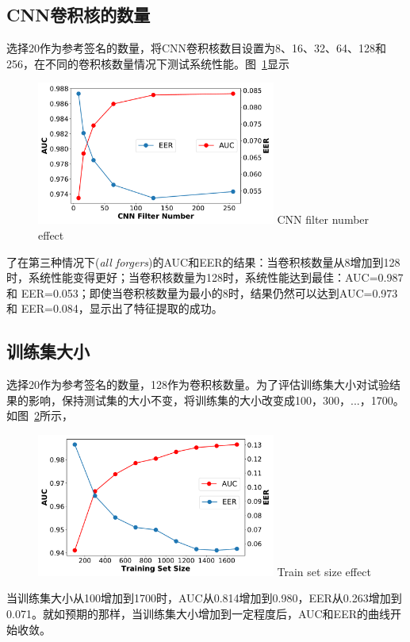\subsection{CNN卷积核的数量}
选择20作为参考签名的数量，将CNN卷积核数目设置为8、16、32、64、128和256，在不同的卷积核数量情况下测试系统性能。图~\ref{fig:filter-number-effect}显示
\begin{figure}
  \centering
  \includegraphics[width=0.7\textwidth]{figure/filter_number_auc_eer.pdf}
      {CNN filter number effect }
  \label{fig:filter-number-effect}
\end{figure}
了在第三种情况下(\textit{all forgers})的AUC和EER的结果：当卷积核数量从8增加到128时，系统性能变得更好；当卷积核数量为128时，系统性能达到最佳：AUC=0.987 和 EER=0.053；即使当卷积核数量为最小的8时，结果仍然可以达到AUC=0.973 和 EER=0.084，显示出了特征提取的成功。 

\subsection{训练集大小}
选择20作为参考签名的数量，128作为卷积核数量。为了评估训练集大小对试验结果的影响，保持测试集的大小不变，将训练集的大小改变成100，300，...，1700。如图~\ref{fig:train-size-effect}所示，
\begin{figure}
  \centering
  \includegraphics[width=0.7\textwidth]{figure/train_size_auc_eer.pdf}
      {Train set size effect }
  \label{fig:train-size-effect}
\end{figure}
当训练集大小从100增加到1700时，AUC从0.814增加到0.980，EER从0.263增加到0.071。就如预期的那样，当训练集大小增加到一定程度后，AUC和EER的曲线开始收敛。

